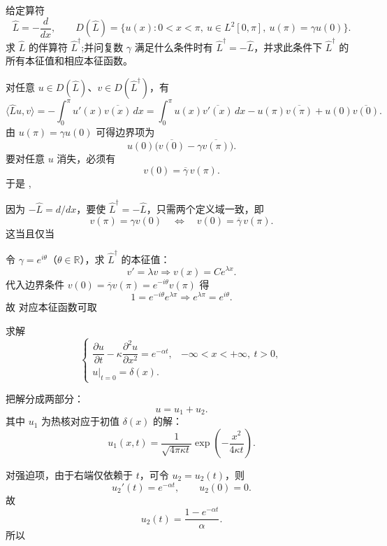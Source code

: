 ﻿

\begin{question}[伴算符与斜自伴]

给定算符
\[
\hat L=-\frac{d}{dx},
\qquad
D(\hat L)=\{u(x):0<x<\pi,\ u\in L^2[0,\pi],\ u(\pi)=\gamma u(0)\}.
\]
求 $\hat L$ 的伴算符 $\hat L^\dagger$;并问复数 $\gamma$ 满足什么条件时有 $\hat L^\dagger=-\hat L$，并求此条件下 $\hat L^\dagger$ 的所有本征值和相应本征函数。

\begin{solution}

对任意 $u\in D(\hat L)$、$v\in D(\hat L^\dagger)$，有
\[
\langle \hat Lu,v\rangle
=-\int_0^{\pi}u'(x)\overline{v(x)}\,dx
=\int_0^{\pi}u(x)\overline{v'(x)}\,dx-u(\pi)\overline{v(\pi)}+u(0)\overline{v(0)}.
\]
由 $u(\pi)=\gamma u(0)$ 可得边界项为
\[
 u(0)\bigl(\overline{v(0)}-\gamma\overline{v(\pi)}\bigr).
\]
要对任意 $u$ 消失，必须有
\[
 v(0)=\overline{\gamma}\,v(\pi).
\]
于是
,
\qquad
{}

因为 $-\hat L=d/dx$，要使 $\hat L^\dagger=-\hat L$，只需两个定义域一致，即
\[
 v(\pi)=\gamma v(0)
\quad\Longleftrightarrow\quad
 v(0)=\overline\gamma\,v(\pi).
\]
这当且仅当

令 $\gamma=e^{i\theta}$（$\theta\in\mathbb R$），求 $\hat L^\dagger$ 的本征值：
\[
 v'=\lambda v
 \Longrightarrow v(x)=Ce^{\lambda x}.
\]
代入边界条件 $v(0)=\overline\gamma v(\pi)=e^{-i\theta}v(\pi)$ 得
\[
1=e^{-i\theta}e^{\lambda\pi}
\Longrightarrow
 e^{\lambda\pi}=e^{i\theta}.
\]
故
对应本征函数可取

\end{solution}
\end{question}

\begin{question}[一维无限长杆上的热传导]

求解
\[
\begin{cases}
\dfrac{\partial u}{\partial t}-\kappa\dfrac{\partial^2u}{\partial x^2}=e^{-\alpha t},
&-\infty<x<+\infty,\ t>0,\\
u|_{t=0}=\delta(x).
\end{cases}
\]

\begin{solution}

把解分成两部分：
\[
 u=u_1+u_2.
\]
其中 $u_1$ 为热核对应于初值 $\delta(x)$ 的解：
\[
 u_1(x,t)=\frac{1}{\sqrt{4\pi\kappa t}}\exp\!\left(-\frac{x^2}{4\kappa t}\right).
\]

对强迫项，由于右端仅依赖于 $t$，可令 $u_2=u_2(t)$，则
\[
 u_2'(t)=e^{-\alpha t},\qquad u_2(0)=0.
\]
故
\[
 u_2(t)=\frac{1-e^{-\alpha t}}{\alpha}.
\]
所以

\end{solution}
\end{question}

